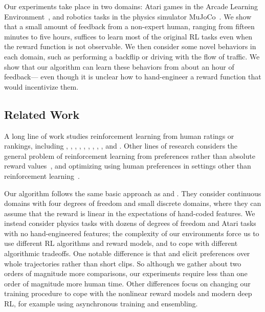 Our experiments take place in two domains: Atari games in the Arcade Learning Environment~\citep{Bellemare13}, and robotics tasks in the physics simulator MuJoCo~\citep{Todorov12}. We show that a small amount of feedback from a non-expert human, ranging from fifteen minutes to five hours, suffices to learn most of the original RL tasks even when the reward function is not observable. We then consider some novel behaviors in each domain, such as performing a backflip or driving with the flow of traffic. We show that our algorithm can learn these behaviors from about an hour of feedback--- even though it is unclear how to hand-engineer a reward function that would incentivize them.

\subsection{Related Work}
\label{ssec:related-work}

A long line of work studies reinforcement learning from human ratings or rankings, including \citet{Akrour11}, \citet{Pilarski11}, \citet{Akrour12}, \citet{Wilson12}, \citet{Sugiyama12}, \citet{Wirth13}, \citet{Daniel15}, \citet{ElAsri16}, \citet{Wang16}, and \citet{Wirth16}.
Other lines of research considers the general problem of reinforcement learning from preferences rather than absolute reward values~\citep{Furnkranz12,Akrour14}, and optimizing using human preferences in settings other than reinforcement learning~\citep{Machwe06, Secretan08, Brochu10, Sorensen16}.

Our algorithm follows the same basic approach as \cite{Akrour12} and \cite{Akrour14}. They consider continuous domains with four degrees of freedom and small discrete domains, where they can assume that the reward is linear in the expectations of hand-coded features. We instead consider physics tasks with dozens of degrees of freedom and Atari tasks with no hand-engineered features; the complexity of our environments force us to use different RL algorithms and reward models, and to cope with different algorithmic tradeoffs. One notable difference is that \cite{Akrour12} and \cite{Akrour14} elicit preferences over whole trajectories rather than short clips. So although we gather about two orders of magnitude more comparisons, our experiments require less than one order of magnitude more human time. Other differences focus on changing our training procedure to cope with the nonlinear reward models and modern deep RL, for example using asynchronous training and ensembling.

